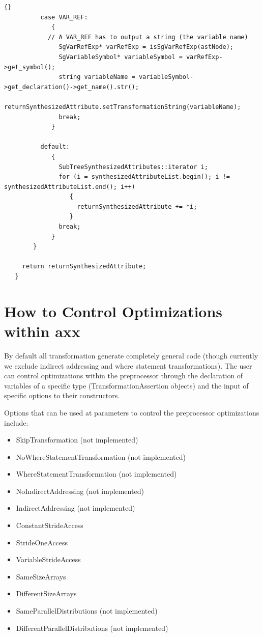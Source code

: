 \documentclass[10pt]{article}
\newcommand{\axx}{{\bf axx\ }}
\begin{document}
{\begin{lstlisting}{}
          case VAR_REF:
             {
            // A VAR_REF has to output a string (the variable name)
               SgVarRefExp* varRefExp = isSgVarRefExp(astNode);
               SgVariableSymbol* variableSymbol = varRefExp->get_symbol();
               string variableName = variableSymbol->get_declaration()->get_name().str();
               returnSynthesizedAttribute.setTransformationString(variableName);
               break;
             }

          default:
             {
               SubTreeSynthesizedAttributes::iterator i;
               for (i = synthesizedAttributeList.begin(); i != synthesizedAttributeList.end(); i++)
                  {
                    returnSynthesizedAttribute += *i;
                  }
               break;
             }
        }

     return returnSynthesizedAttribute;
   }

\end{lstlisting}
}


\section{How to Control Optimizations within \axx}
    By default all transformation generate completely general code (though currently we exclude
indirect addressing and where statement transformations).  The user can control optimizations within
the preprocessor through the declaration of variables of a specific type (TransformationAssertion
objects) and the input of specific options to their constructors.

Options that can be used at parameters to control the preprocessor optimizations include:
\begin{itemize}
   \item SkipTransformation             (not implemented)
   \item NoWhereStatementTransformation (not implemented)
   \item WhereStatementTransformation   (not implemented)
   \item NoIndirectAddressing           (not implemented)
   \item IndirectAddressing             (not implemented)
   \item ConstantStrideAccess
   \item StrideOneAccess
   \item VariableStrideAccess
   \item SameSizeArrays
   \item DifferentSizeArrays
   \item SameParallelDistributions      (not implemented)
   \item DifferentParallelDistributions (not implemented)
\end{itemize}
\end{document}
